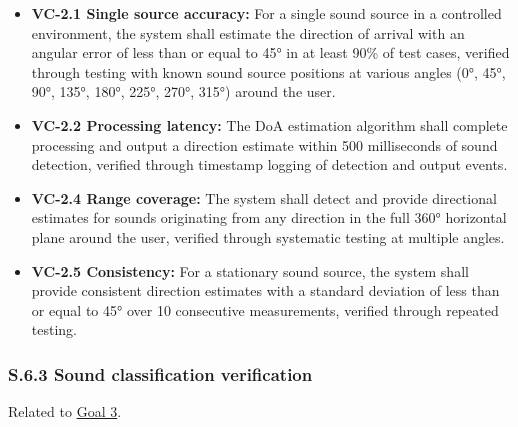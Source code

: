\documentclass[12pt]{article}
\theoremstyle{definition}
\begin{document}
\begin{itemize}
\item \textbf{VC-2.1 Single source accuracy:} For a single sound source in 
a controlled environment, the system shall estimate the direction of arrival 
with an angular error of less than or equal to 45° in at least 90\% of 
test cases, verified 
through testing with known sound source positions at various angles (0°, 45°, 
90°, 135°, 180°, 225°, 270°, 315°) around the user.

\item \textbf{VC-2.2 Processing latency:} The DoA estimation algorithm shall 
complete processing and output a direction estimate within 500 milliseconds 
of sound detection, verified through timestamp logging of detection and 
output events.

\item \textbf{VC-2.4 Range coverage:} The system shall detect and provide 
directional estimates for sounds originating from any direction in the full 
360° horizontal plane around the user, verified through systematic testing 
at multiple angles.

\item \textbf{VC-2.5 Consistency:} For a stationary sound source, the system 
shall provide consistent direction estimates with a standard deviation of 
less than or equal to 45° over 10 consecutive measurements, 
verified through repeated testing.
\end{itemize}

\subsubsection{S.6.3 Sound classification verification}

Related to \hyperref[goal:audio_identification_analysis]{Goal 3}.
\end{document}
